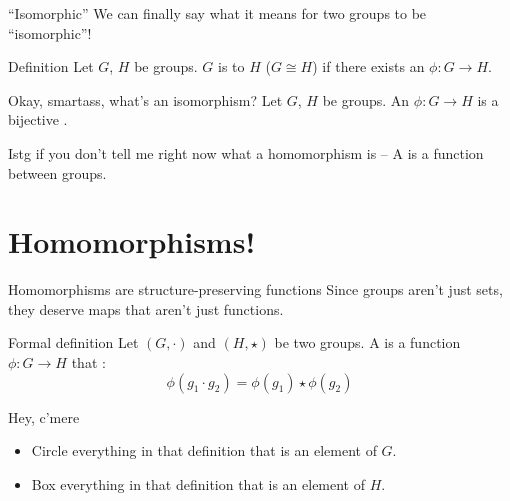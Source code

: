 \documentclass[8pt, handout]{beamer}
\begin{document}
\begin{frame}{``Isomorphic''}
  We can finally say what it means for two groups to be ``isomorphic''! \pause
  \begin{block}{Definition}
    Let $G$, $H$ be groups. $G$ is  to $H$ ($G\cong H$) if there exists an  $\phi: G\to H$.
  \end{block} \pause 

  \begin{block}{Okay, smartass, what's an isomorphism?} \pause
    Let $G$, $H$ be groups. An  $\phi: G \to H$ is a bijective .
  \end{block} \pause

  \begin{exampleblock}{Istg if you don't tell me right now what a homomorphism is --} \pause
    A  is a  function between groups.
  \end{exampleblock}
\end{frame}

\section{Homomorphisms!}

\begin{frame}{Homomorphisms are structure-preserving functions}
  Since groups aren't just sets, they deserve maps that aren't just functions. \pause

  \begin{block}{Formal definition}
    Let $(G, \cdot)$ and $(H, \star)$ be two groups. A  is a function $\phi: G\to H$ that :
    \[\phi(g_1 \cdot g_2) = \phi(g_1) \star \phi(g_2)\]
  \end{block} \pause
  \begin{alertblock}{Hey, c'mere} \pause
    \begin{itemize}
      \item Circle everything in that definition that is an element of $G$. \pause
      \item Box everything in that definition that is an element of $H$.
    \end{itemize}
  \end{alertblock}
\end{frame}
\end{document}
